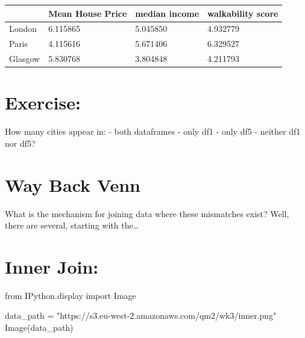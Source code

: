 \documentclass[
  letterpaper,
  DIV=11,
  numbers=noendperiod]{scrreprt}
\newenvironment{Shaded}{\begin{snugshade}}{\end{snugshade}}
\newcommand{\ImportTok}[1]{\textcolor[rgb]{0.00,0.46,0.62}{#1}}
\newcommand{\NormalTok}[1]{\textcolor[rgb]{0.00,0.23,0.31}{#1}}
\newcommand{\OperatorTok}[1]{\textcolor[rgb]{0.37,0.37,0.37}{#1}}
\newcommand{\StringTok}[1]{\textcolor[rgb]{0.13,0.47,0.30}{#1}}
\begin{document}
\begin{longtable}[]{@{}llll@{}}
\toprule()
& Mean House Price & median income & walkability score \\
\midrule()
\endhead
London & 6.115865 & 5.045850 & 4.932779 \\
Paris & 4.115616 & 5.671406 & 6.329527 \\
Glasgow & 5.830768 & 3.804848 & 4.211793 \\
\bottomrule()
\end{longtable}

\hypertarget{exercise-13}{%
\section{Exercise:}\label{exercise-13}}

How many cities appear in: - both dataframes - only df1 - only df5 -
neither df1 nor df5?

\hypertarget{way-back-venn}{%
\section{Way Back Venn}\label{way-back-venn}}

What is the mechanism for joining data where these mismatches exist?
Well, there are several, starting with the\ldots{}

\hypertarget{inner-join}{%
\section{Inner Join:}\label{inner-join}}

\begin{Shaded}
\begin{Highlighting}[]
\ImportTok{from}\NormalTok{ IPython.display }\ImportTok{import}\NormalTok{ Image}

\NormalTok{data\_path }\OperatorTok{=} \StringTok{"https://s3.eu{-}west{-}2.amazonaws.com/qm2/wk3/inner.png"}
\NormalTok{Image(data\_path)}
\end{Highlighting}
\end{Shaded}
\end{document}
